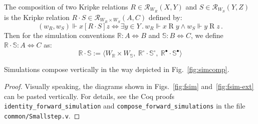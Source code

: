 \documentclass[acmsmall,screen,review,anonymous]{acmart}
\newcommand{\ifr}[1]{\mathrel{[{#1}]}}
\newcommand{\que}{\circ}
\newcommand{\ans}{\bullet}
\begin{document}
\begin{definition} %
The composition of two Kripke relations
$R \in \mathcal{R}_{W_R}(X, Y)$ and
$S \in \mathcal{R}_{W_S}(Y, Z)$
is the Kripke relation
$R \cdot S \in \mathcal{R}_{W_R \times W_S}(A, C)$
defined by:
\[
  (w_R, w_S) \Vdash x \ifr{R \cdot S} z \Leftrightarrow
  \exists y \in Y \,.\,
    w_R \Vdash x \mathrel{R} y \wedge
    w_S \Vdash y \mathrel{R} z \,.
\]
Then for the simulation conventions
$\mathbb{R} : A \Leftrightarrow B$ and
$\mathbb{S} : B \Leftrightarrow C$,
we define
$\mathbb{R} \cdot \mathbb{S} : A \Leftrightarrow C$ as:
\[
  \mathbb{R} \cdot \mathbb{S} :=
  \langle
    W_\mathbb{R} \times W_\mathbb{S}, \:
    \mathbb{R}^\que \cdot \mathbb{S}^\que, \:
    \mathbb{R}^\ans \cdot \mathbb{S}^\ans
  \rangle
\]
\end{definition}

\begin{theorem} \label{thm:fsim-vcomp} %
Simulations compose vertically
in the way depicted in Fig.~\ref{fig:simcomp}.
\begin{proof}
Visually speaking,
the diagrams shown in Figs.~\ref{fig:fsim} and~\ref{fig:fsim-ext}
can be pasted vertically.
For details,
see the Coq proofs
\texttt{identity\_forward\_simulation}
and \texttt{compose\_forward\_simulations}
in the file \texttt{common/Smallstep.v}.
\end{proof}
\end{theorem}

\end{document}
